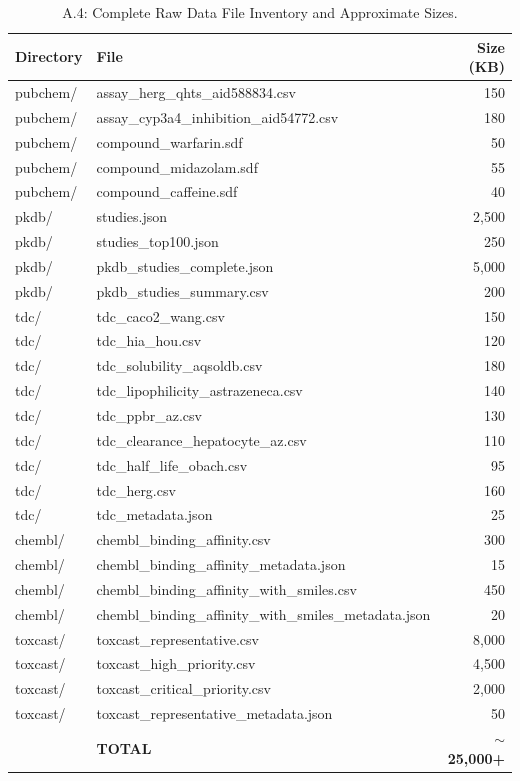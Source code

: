 \documentclass[a4paper,11pt,twoside]{report}
\begin{document}
\begin{table}[htbp]
\centering
\footnotesize
\caption{A.4: Complete Raw Data File Inventory and Approximate Sizes.}
\label{tab:file_inventory}
\begin{tabular}{l|l|r}
\hline
\textbf{Directory} & \textbf{File} & \textbf{Size (KB)} \\
\hline
pubchem/ & assay\_herg\_qhts\_aid588834.csv & 150 \\
pubchem/ & assay\_cyp3a4\_inhibition\_aid54772.csv & 180 \\
pubchem/ & compound\_warfarin.sdf & 50 \\
pubchem/ & compound\_midazolam.sdf & 55 \\
pubchem/ & compound\_caffeine.sdf & 40 \\
\hline
pkdb/ & studies.json & 2,500 \\
pkdb/ & studies\_top100.json & 250 \\
pkdb/ & pkdb\_studies\_complete.json & 5,000 \\
pkdb/ & pkdb\_studies\_summary.csv & 200 \\
\hline
tdc/ & tdc\_caco2\_wang.csv & 150 \\
tdc/ & tdc\_hia\_hou.csv & 120 \\
tdc/ & tdc\_solubility\_aqsoldb.csv & 180 \\
tdc/ & tdc\_lipophilicity\_astrazeneca.csv & 140 \\
tdc/ & tdc\_ppbr\_az.csv & 130 \\
tdc/ & tdc\_clearance\_hepatocyte\_az.csv & 110 \\
tdc/ & tdc\_half\_life\_obach.csv & 95 \\
tdc/ & tdc\_herg.csv & 160 \\
tdc/ & tdc\_metadata.json & 25 \\
\hline
chembl/ & chembl\_binding\_affinity.csv & 300 \\
chembl/ & chembl\_binding\_affinity\_metadata.json & 15 \\
chembl/ & chembl\_binding\_affinity\_with\_smiles.csv & 450 \\
chembl/ & chembl\_binding\_affinity\_with\_smiles\_metadata.json & 20 \\
\hline
toxcast/ & toxcast\_representative.csv & 8,000 \\
toxcast/ & toxcast\_high\_priority.csv & 4,500 \\
toxcast/ & toxcast\_critical\_priority.csv & 2,000 \\
toxcast/ & toxcast\_representative\_metadata.json & 50 \\
\hline
 & \textbf{TOTAL} & \textbf{$\sim$25,000+} \\
\hline
\end{tabular}
\end{table}
\end{document}
